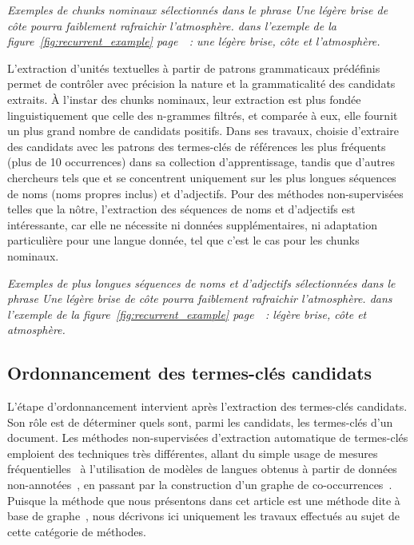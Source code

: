     \textit{Exemples de chunks nominaux sélectionnés dans le phrase \og{}Une
    légère brise de côte pourra faiblement rafraichir l'atmosphère.\fg{} dans
    l'exemple de la figure~\ref{fig:recurrent_example}
    page~\pageref{fig:recurrent_example}~: \og{}une légère brise\fg{},
    \og{}côte\fg{} et \og{}l'atmosphère\fg{}.}

    L'extraction d'unités textuelles à partir de patrons grammaticaux prédéfinis
    permet de contrôler avec précision la nature et la grammaticalité des
    candidats extraits. À l'instar des chunks nominaux, leur extraction est plus
    fondée linguistiquement que celle des n-grammes filtrés, et comparée à eux,
    elle fournit un plus grand nombre de candidats positifs. Dans ses travaux,
     choisie d'extraire des candidats avec
    les patrons des termes-clés de références les plus fréquents (plus de 10
    occurrences) dans sa collection d'apprentissage, tandis que d'autres
    chercheurs tels que  et
     se concentrent uniquement sur les plus
    longues séquences de noms (noms propres inclus) et d'adjectifs. Pour des
    méthodes non-supervisées telles que la nôtre, l'extraction des séquences de 
    noms et d'adjectifs est intéressante, car elle ne nécessite ni données
    supplémentaires, ni adaptation particulière pour une langue donnée, tel que
    c'est le cas pour les chunks nominaux.

    \textit{Exemples de plus longues séquences de noms et d'adjectifs
    sélectionnées dans le phrase \og{}Une légère brise de côte pourra faiblement
    rafraichir l'atmosphère.\fg{} dans l'exemple de la
    figure~\ref{fig:recurrent_example} page~\pageref{fig:recurrent_example}~:
    \og{}légère brise\fg{}, \og{}côte\fg{} et \og{}atmosphère\fg{}.}

  \subsection{Ordonnancement des termes-clés candidats}
  \label{subsec:ordonnancement_des_termes_cles_candidats}
    L'étape d'ordonnancement intervient après l'extraction des termes-clés
    candidats. Son rôle est de déterminer quels sont, parmi les candidats, les
    termes-clés d'un document.
    Les méthodes non-supervisées d'extraction automatique de termes-clés
    emploient des techniques très différentes, allant du simple usage de mesures
    fréquentielles~\cite{paukkeri2010likey} à l'utilisation de modèles de
    langues obtenus à partir de données
    non-annotées~\cite{tomokiyo2003languagemodel}, en passant par la
    construction d'un graphe de co-occurrences~\cite{mihalcea2004textrank}.
    Puisque la méthode que nous présentons dans cet article est une méthode dite
    \og à base de graphe~\fg, nous décrivons ici uniquement les travaux
    effectués au sujet de cette catégorie de méthodes.

